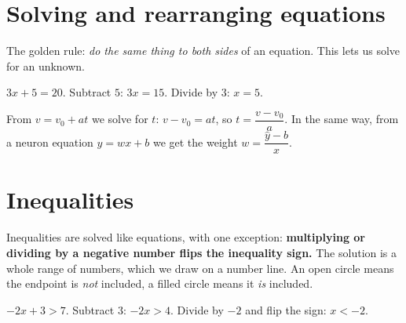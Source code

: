 \label{ch:algebra}

\section*{Solving and rearranging equations}
The golden rule: \emph{do the same thing to both sides} of an equation. This lets us solve for an unknown.

\begin{example}
$3x+5=20$. Subtract $5$: $3x=15$. Divide by $3$: $x=5$.
\end{example}

\begin{example}
From $v=v_0+at$ we solve for $t$: $v-v_0=at$, so $t=\dfrac{v-v_0}{a}$. In the same way, from a neuron equation $\hat y=wx+b$ we get the weight $w=\dfrac{\hat y-b}{x}$.
\end{example}

\section*{Inequalities}
Inequalities are solved like equations, with one exception: \textbf{multiplying or dividing by a negative number flips the inequality sign.} The solution is a whole range of numbers, which we draw on a number line. An open circle means the endpoint is \emph{not} included, a filled circle means it \emph{is} included.

\begin{example}
$-2x+3>7$. Subtract $3$: $-2x>4$. Divide by $-2$ and flip the sign: $x<-2$.
\end{example}

\begin{center}

\label{fig:b1_6}
\end{center}


